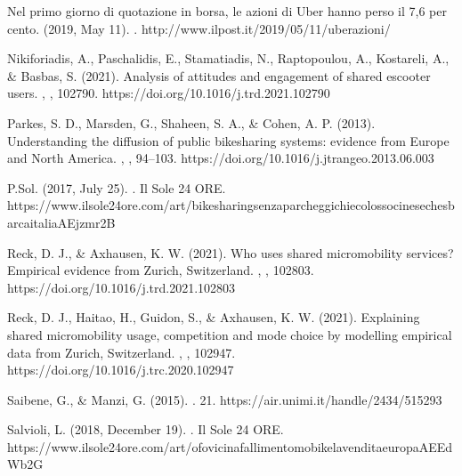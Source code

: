 \documentclass[letterpaper,10pt,english]{jupyterBook}
\begin{document}
\sphinxAtStartPar
Nel primo giorno di quotazione in borsa, le azioni di Uber hanno perso il 7,6 per cento. (2019, May 11). . http://www.ilpost.it/2019/05/11/uber\sphinxhyphen{}azioni/

\sphinxAtStartPar
Nikiforiadis, A., Paschalidis, E., Stamatiadis, N., Raptopoulou, A., Kostareli, A., \& Basbas, S. (2021). Analysis of attitudes and engagement of shared e\sphinxhyphen{}scooter users. , , 102790. https://doi.org/10.1016/j.trd.2021.102790

\sphinxAtStartPar
Parkes, S. D., Marsden, G., Shaheen, S. A., \& Cohen, A. P. (2013). Understanding the diffusion of public bikesharing systems: evidence from Europe and North America. , , 94–103. https://doi.org/10.1016/j.jtrangeo.2013.06.003

\sphinxAtStartPar
P.Sol. (2017, July 25). . Il Sole 24 ORE. https://www.ilsole24ore.com/art/bike\sphinxhyphen{}sharing\sphinxhyphen{}senza\sphinxhyphen{}parcheggi\sphinxhyphen{}chi\sphinxhyphen{}e\sphinxhyphen{}colosso\sphinxhyphen{}cinese\sphinxhyphen{}che\sphinxhyphen{}sbarca\sphinxhyphen{}italia\sphinxhyphen{}AEjzmr2B

\sphinxAtStartPar
Reck, D. J., \& Axhausen, K. W. (2021). Who uses shared micro\sphinxhyphen{}mobility services? Empirical evidence from Zurich, Switzerland. , , 102803. https://doi.org/10.1016/j.trd.2021.102803

\sphinxAtStartPar
Reck, D. J., Haitao, H., Guidon, S., \& Axhausen, K. W. (2021). Explaining shared micromobility usage, competition and mode choice by modelling empirical data from Zurich, Switzerland. , , 102947. https://doi.org/10.1016/j.trc.2020.102947

\sphinxAtStartPar
Saibene, G., \& Manzi, G. (2015). . 21. https://air.unimi.it/handle/2434/515293

\sphinxAtStartPar
Salvioli, L. (2018, December 19). . Il Sole 24 ORE. https://www.ilsole24ore.com/art/ofo\sphinxhyphen{}vicina\sphinxhyphen{}fallimento\sphinxhyphen{}mobike\sphinxhyphen{}la\sphinxhyphen{}vendita\sphinxhyphen{}europa\sphinxhyphen{}AEEdWb2G
\end{document}
